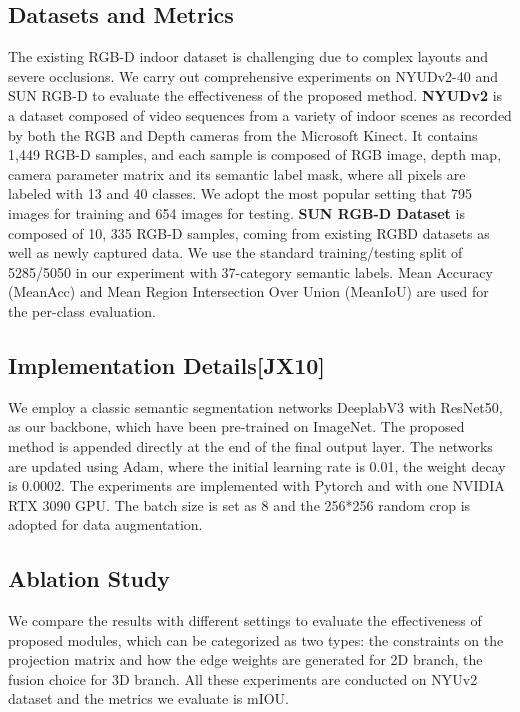 ﻿\documentclass[journal]{IEEEtran}
\begin{document}
\subsection{Datasets and Metrics}  
    The existing RGB-D indoor dataset is challenging due to complex layouts and severe occlusions. We carry out comprehensive experiments on NYUDv2-40  \cite{silberman2012indoor} and SUN RGB-D \cite{song2015sun} to evaluate the effectiveness of the proposed method. \textbf{NYUDv2} is a dataset composed of video sequences from a variety of indoor scenes as recorded by both the RGB and Depth cameras from the Microsoft Kinect. It contains 1,449 RGB-D samples, and each sample is composed of RGB image, depth map, camera parameter matrix and its semantic label mask, where all pixels are labeled with 13 and 40 classes. We adopt the most popular setting that 795 images for training and 654 images for testing. \textbf{SUN RGB-D Dataset} is composed of 10, 335 RGB-D samples, coming from existing RGBD datasets \cite{silberman2012indoor} \cite{janoch2013category} \cite{xiao2013sun3d} as well as newly captured data. We use the standard training/testing split \cite{song2015sun} of 5285/5050 in our experiment with 37-category semantic labels. Mean Accuracy (MeanAcc) and Mean Region Intersection Over Union (MeanIoU) are used for the per-class evaluation.  


\subsection{Implementation Details[JX10]}  
 
    We employ a classic semantic segmentation networks DeeplabV3 with ResNet50, as our backbone, which have been pre-trained on ImageNet. The proposed method is appended directly at the end of the final output layer. The networks are updated using Adam, where the initial learning rate is 0.01, the weight decay is 0.0002. The experiments are implemented with Pytorch and with one NVIDIA RTX 3090 GPU. The batch size is set as 8 and the 256*256 random crop is adopted for data augmentation. 

    \subsection{Ablation Study}\label{sec_sub_ablation_study} 
    We compare the results with different settings to evaluate the effectiveness of proposed modules, which can be categorized as two types: the constraints on the projection matrix and how the edge weights are generated for 2D branch, the fusion choice for 3D branch. All these experiments are conducted on NYUv2 dataset and the metrics we evaluate is mIOU. \\
    
\end{document}
